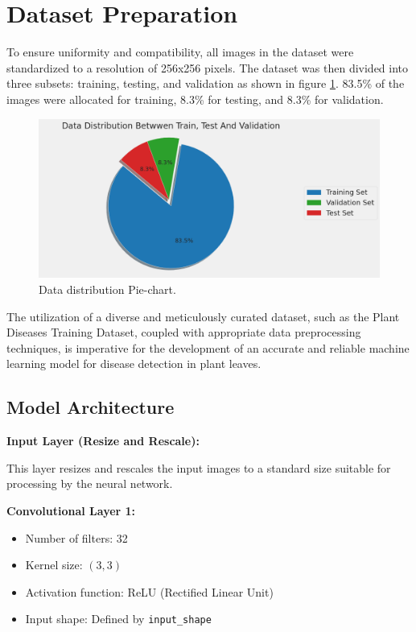 \documentclass{article}
\begin{document}
\section{Dataset Preparation}
To ensure uniformity and compatibility, all images in the dataset were standardized to a resolution of 256x256 pixels. The dataset was then divided into three subsets: training, testing, and validation as shown in figure \ref{fig:data_distribution}. 83.5\% of the images were allocated for training, 8.3\% for testing, and 8.3\% for validation.

\begin{figure}[h]
    \centering
    \includegraphics[width=1.00\textwidth]{data_distribution.png}
    \caption{Data distribution Pie-chart.}
    \label{fig:data_distribution}
\end{figure}

The utilization of a diverse and meticulously curated dataset, such as the Plant Diseases Training Dataset, coupled with appropriate data preprocessing techniques, is imperative for the development of an accurate and reliable machine learning model for disease detection in plant leaves.



\subsection{Model Architecture}
\textbf{Input Layer (Resize and Rescale):}

This layer resizes and rescales the input images to a standard size suitable for processing by the neural network.

\textbf{Convolutional Layer 1:}
\begin{itemize}
    \item Number of filters: 32
    \item Kernel size: $(3, 3)$
    \item Activation function: ReLU (Rectified Linear Unit)
    \item Input shape: Defined by \texttt{input\_shape}
\end{itemize}
\end{document}
